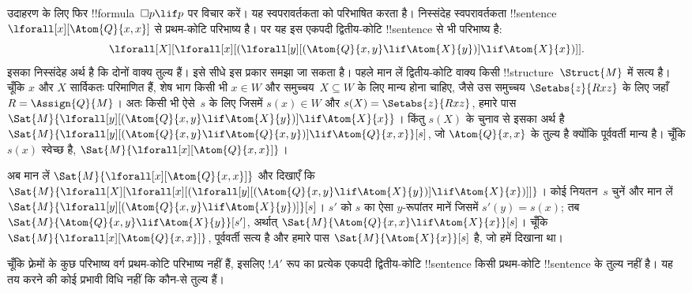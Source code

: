 \documentclass[../../../include/open-logic-section]{subfiles}
\begin{document}
उदाहरण के लिए फिर !!{formula}~$\Box p \lif p$ पर विचार करें। यह
स्वपरावर्तकता को परिभाषित करता है। निस्संदेह स्वपरावर्तकता
!!{sentence}~$\lforall[x][\Atom{Q}{x,x}]$ से प्रथम-कोटि परिभाष्य है। पर यह इस
एकपदी द्वितीय-कोटि !!{sentence} से भी परिभाष्य है:
\[
\lforall[X][\lforall[x][(\lforall[y][(\Atom{Q}{x,y} \lif \Atom{X}{y})]
    \lif \Atom{X}{x})]].
\]
इसका निस्संदेह अर्थ है कि दोनों वाक्य तुल्य हैं। इसे सीधे इस प्रकार समझा जा
सकता है। पहले मान लें द्वितीय-कोटि वाक्य किसी !!{structure}~$\Struct{M}$ में
सत्य है। चूँकि $x$ और $X$ सार्विकतः परिमाणित हैं, शेष भाग किसी भी $x \in W$
और समुच्चय~$X \subseteq W$ के लिए मान्य होना चाहिए, जैसे उस समुच्चय
$\Setabs{z}{Rxz}$ के लिए जहाँ $R = \Assign{Q}{M}$। अतः किसी भी ऐसे~$s$ के
लिए जिसमें $s(x) \in W$ और $s(X) = \Setabs{z}{Rxz}$, हमारे पास
$\Sat{M}{\lforall[y][(\Atom{Q}{x,y} \lif \Atom{X}{y})] \lif
\Atom{X}{x}}$। किंतु $s(X)$ के चुनाव से इसका अर्थ है
$\Sat{M}{\lforall[y][(\Atom{Q}{x,y} \lif \Atom{Q}{x,y})] \lif
\Atom{Q}{x,x}}[s]$, जो $\Atom{Q}{x,x}$ के तुल्य है क्योंकि पूर्ववर्ती मान्य
है। चूँकि $s(x)$ स्वेच्छ है, $\Sat{M}{\lforall[x][\Atom{Q}{x,x}]}$।

अब मान लें $\Sat{M}{\lforall[x][\Atom{Q}{x,x}]}$ और दिखाएँ कि
$\Sat{M}{\lforall[X][\lforall[x][(\lforall[y][(\Atom{Q}{x,y} \lif
        \Atom{X}{y})] \lif \Atom{X}{x})]]}$। कोई नियतन~$s$ चुनें और मान
लें $\Sat{M}{\lforall[y][(\Atom{Q}{x,y} \lif \Atom{X}{y})]}[s]$। $s'$ को
$s$ का ऐसा $y$-रूपांतर मानें जिसमें $s'(y)=s(x)$; तब
$\Sat{M}{\Atom{Q}{x,y} \lif \Atom{X}{y}}[s']$, अर्थात्
$\Sat{M}{\Atom{Q}{x,x} \lif \Atom{X}{x}}[s]$। चूँकि
$\Sat{M}{\lforall[x][\Atom{Q}{x,x}]}$, पूर्ववर्ती सत्य है और हमारे पास
$\Sat{M}{\Atom{X}{x}}[s]$ है, जो हमें दिखाना था।

चूँकि फ़्रेमों के कुछ परिभाष्य वर्ग प्रथम-कोटि परिभाष्य नहीं हैं, इसलिए
$!A'$ रूप का प्रत्येक एकपदी द्वितीय-कोटि !!{sentence} किसी प्रथम-कोटि
!!{sentence} के तुल्य नहीं है। यह तय करने की कोई प्रभावी विधि नहीं कि कौन-से
तुल्य हैं।
\end{document}
